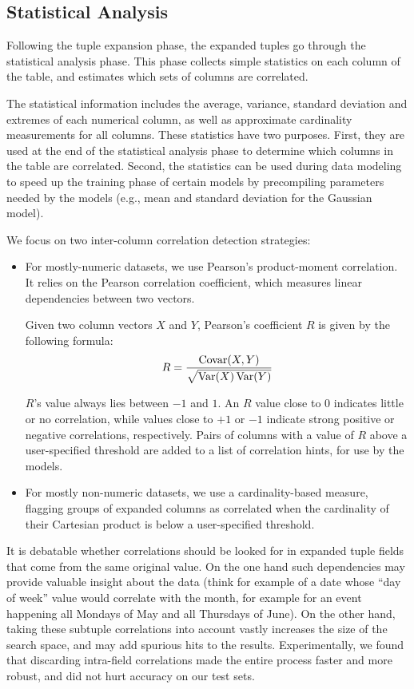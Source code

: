 \subsection{Statistical Analysis}
\label{sec:statistical-analysis}

Following the tuple expansion phase, the expanded tuples go through the statistical analysis phase. This phase collects simple statistics on each column of the table, and estimates which sets of columns are correlated.

The statistical information includes the average, variance, standard deviation and extremes of each numerical column, as well as approximate cardinality measurements for all columns. These statistics have two purposes. First, they are used at the end of the statistical analysis phase to determine which columns in the table are correlated. Second, the statistics can be used during data modeling to speed up the training phase of certain models by precompiling parameters needed by the models (e.g., mean and standard deviation for the Gaussian model).

We focus on two inter-column correlation detection strategies:

\begin{itemize}
\item For mostly-numeric datasets, we use Pearson's product-moment
  correlation. It relies on the Pearson correlation coefficient,
  which measures linear dependencies between two vectors.

  Given two column vectors $X$ and $Y$, Pearson's coefficient $R$ is given by the following formula:
  \begin{align}
    \label{eqn:pearson}
    R = \frac{\operatorname{Covar}(X,Y)}{\sqrt{\operatorname{Var}(X)\operatorname{Var}(Y)}}
  \end{align}

  $R$'s value always lies between $-1$ and $1$. An $R$ value close to 0 indicates little or no correlation, while values close to $+1$ or $-1$ indicate strong positive or negative correlations, respectively. Pairs of columns with a value of \(R\) above a user-specified threshold are added to a list of correlation hints, for use by the models.
\item For mostly non-numeric datasets, we use a cardinality-based measure, flagging groups of expanded columns as correlated when the cardinality of their Cartesian product is below a user-specified threshold.
\end{itemize}

It is debatable whether correlations should be looked for in expanded tuple fields that come from the same original value. On the one hand such dependencies may provide valuable insight about the data (think for example of a date whose ``day of week'' value would correlate with the month, for example for an event happening all Mondays of May and all Thursdays of June). On the other hand, taking these subtuple correlations into account vastly increases the size of the search space, and may add spurious hits to the results. Experimentally, we found that discarding intra-field correlations made the entire process faster and more robust, and did not hurt accuracy on our test sets.

